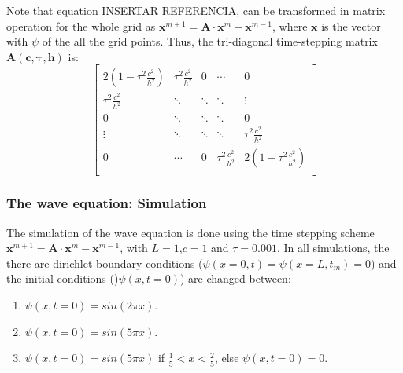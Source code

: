 Note that equation INSERTAR REFERENCIA, can be transformed in matrix operation for the whole grid as $\mathbf{x}^{m+1}= \mathbf{A} \cdot \mathbf{x}^{m} - \mathbf{x}^{m-1}$, where $\mathbf{x}$ is the vector
with $\psi$ of the all the grid points. Thus, the tri-diagonal time-stepping matrix $\mathbf{A(c,\tau,h)}$ is:
\[
    \begin{bmatrix}
        2(1 - \tau^{2}\frac{c^{2}}{h^2}) & \tau^{2}\frac{c^{2}}{h^2} & 0      & \cdots                    & 0                                \\
        \tau^{2}\frac{c^{2}}{h^2}        & \ddots                    & \ddots & \ddots                    & \vdots                           \\
        0                                & \ddots                    & \ddots & \ddots                    & 0                                \\
        \vdots                           & \ddots                    & \ddots & \ddots                    & \tau^{2}\frac{c^{2}}{h^2}        \\
        0                                & \cdots                    & 0      & \tau^{2}\frac{c^{2}}{h^2} & 2(1 - \tau^{2}\frac{c^{2}}{h^2}) \\
    \end{bmatrix}
\]

\subsubsection{The wave equation: Simulation}
The simulation of the wave equation is done using the time stepping scheme  $\mathbf{x}^{m+1}= \mathbf{A} \cdot \mathbf{x}^{m} - \mathbf{x}^{m-1}$, with $L=1$,$c=1$ and $\tau = 0.001$.
In all simulations, the there are dirichlet boundary conditions ($\psi(x = 0,t) = \psi(x = L,t_{m}) = 0$) and the initial conditions ()$\psi(x,t = 0)$) are changed between:
\begin{enumerate}
    \item $\psi(x,t = 0) = sin(2\pi x)$.
    \item $\psi(x,t = 0) = sin(5\pi x)$.
    \item $\psi(x,t = 0) = sin(5\pi x)$ if $\frac{1}{5} < x < \frac{2}{5}$, else $\psi(x,t = 0) = 0$.
\end{enumerate}

